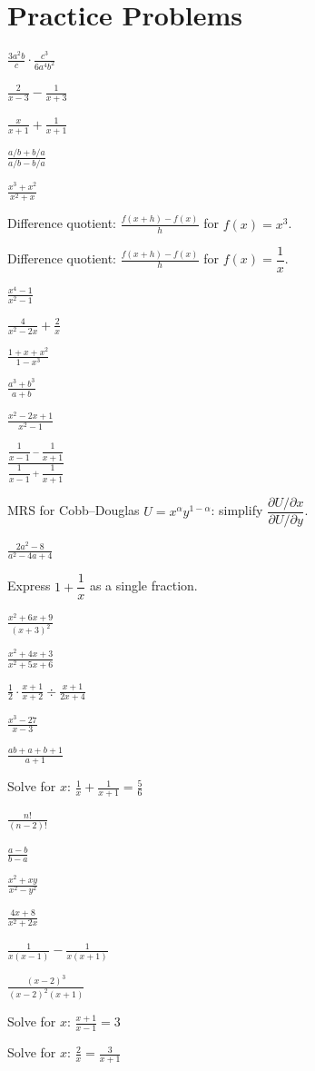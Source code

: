\section{Practice Problems}

\begin{problems}
  \item $\displaystyle\frac{3a^{2}b}{c}\cdot\frac{c^{3}}{6a^{4}b^{2}}$
  \item $\displaystyle\frac{2}{x-3}-\frac{1}{x+3}$
  \item $\displaystyle\frac{x}{x+1}+\frac{1}{x+1}$
  \item $\displaystyle\frac{a/b+b/a}{a/b-b/a}$
  \item $\displaystyle\frac{x^{3}+x^{2}}{x^{2}+x}$
  \item Difference quotient: $\displaystyle\frac{f(x+h)-f(x)}{h}$
        for $f(x)=x^{3}$.
  \item Difference quotient: $\displaystyle\frac{f(x+h)-f(x)}{h}$
        for $f(x)=\dfrac{1}{x}$.
  \item $\displaystyle\frac{x^{4}-1}{x^{2}-1}$
  \item $\displaystyle\frac{4}{x^{2}-2x}+\frac{2}{x}$
  \item $\displaystyle\frac{1+x+x^{2}}{1-x^{3}}$
  \item $\displaystyle\frac{a^{3}+b^{3}}{a+b}$
  \item $\displaystyle\frac{x^{2}-2x+1}{x^{2}-1}$
  \item $\displaystyle\frac{\dfrac{1}{x-1}-\dfrac{1}{x+1}}
        {\dfrac{1}{x-1}+\dfrac{1}{x+1}}$
  \item MRS for Cobb--Douglas $U=x^{\alpha}y^{1-\alpha}$: simplify
        $\dfrac{\partial U/\partial x}{\partial U/\partial y}$.
  \item $\displaystyle\frac{2a^{2}-8}{a^{2}-4a+4}$
  \item Express $1+\dfrac{1}{x}$ as a single fraction.
  \item $\displaystyle\frac{x^{2}+6x+9}{(x+3)^{2}}$
  \item $\displaystyle\frac{x^{2}+4x+3}{x^{2}+5x+6}$
  \item $\displaystyle\frac{1}{2}\cdot\frac{x+1}{x+2}\div\frac{x+1}{2x+4}$
  \item $\displaystyle\frac{x^{3}-27}{x-3}$
  \item $\displaystyle\frac{ab+a+b+1}{a+1}$
  \item Solve for $x$: $\displaystyle\frac{1}{x}+\frac{1}{x+1}=\frac{5}{6}$
  \item $\displaystyle\frac{n!}{(n-2)!}$
  \item $\displaystyle\frac{a-b}{b-a}$
  \item $\displaystyle\frac{x^{2}+xy}{x^{2}-y^{2}}$
  \item $\displaystyle\frac{4x+8}{x^{2}+2x}$
  \item $\displaystyle\frac{1}{x(x-1)}-\frac{1}{x(x+1)}$
  \item $\displaystyle\frac{(x-2)^{3}}{(x-2)^{2}(x+1)}$
  \item Solve for $x$: $\displaystyle\frac{x+1}{x-1}=3$
  \item Solve for $x$: $\displaystyle\frac{2}{x}=\frac{3}{x+1}$
\end{problems}

